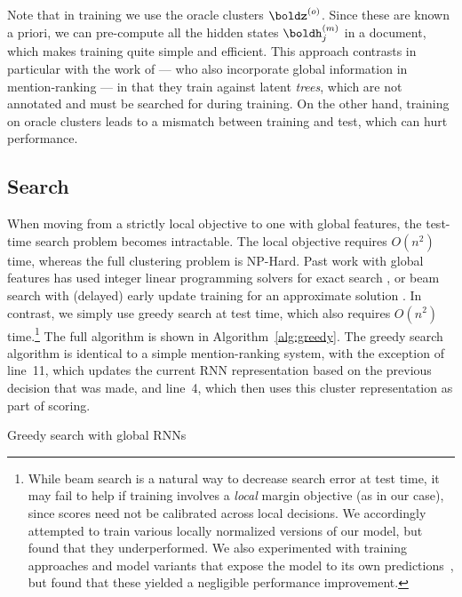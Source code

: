 \documentclass[11pt,letterpaper]{article}
\newcommand{\RNN}{\mathrm{\mathbf{RNN}}}
\newcommand{\uc}{\ensuremath{\mathrm{c}}}
\newcommand{\hc}{\boldh_{\uc}}
\begin{document}
Note that in training we use the oracle clusters $\boldz^{(o)}$. Since these are known a priori, we can pre-compute all the hidden states $\boldh_j^{(m)}$ in a document, which makes training quite simple and efficient. This approach contrasts in particular with the work of  --- who also incorporate global information in mention-ranking --- in that they train against latent \textit{trees}, which are not annotated and must be searched for during training. On the other hand, training on oracle clusters leads to a mismatch between training and test, which can hurt performance.

\subsection{Search}
When moving from a strictly local objective to one with
global features, the test-time search problem becomes intractable. The
local objective requires $O(n^2)$ time, whereas the full clustering problem is NP-Hard. Past work with global features has used integer linear programming solvers for exact search
\cite{Chang:13,peng15a}, or beam search with (delayed) early update training for an
approximate solution \cite{BandK:14}. In contrast, we simply use greedy search at
test time, which also requires $O(n^2)$ time.\footnote{While beam search is a natural way to decrease search error at test time, it may fail to help if training involves a \textit{local} margin objective (as in our case), since scores need not be calibrated across local decisions. We accordingly attempted to train various locally normalized versions of our model, but found that they underperformed. 
We also experimented with training approaches and model variants that expose the model to its own predictions~\cite{daume09search,ross11a,bengio15scheduled}, but found that these yielded a negligible performance improvement.} The full algorithm is shown in Algorithm~\ref{alg:greedy}. The greedy search algorithm is identical to a simple mention-ranking system, with the exception of line~11, which updates the current RNN representation based on the previous decision that was made, and line~4, which then uses this
cluster representation as part of scoring. 
 
\begin{algorithm}[t!]
  \footnotesize
  \begin{algorithmic}[1]
    \EndIf{}
    \State{$\boldh^{(m)} \gets \RNN(\hc(x_n), \boldh^{(m)})$}
    \EndFor{}
    \EndProcedure{}
  \end{algorithmic}
  \caption{\label{alg:greedy} Greedy search with global RNNs}
\end{algorithm}  
\end{document}
